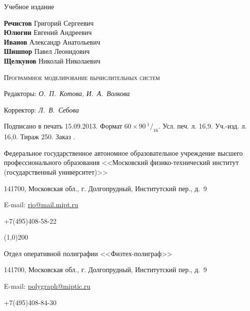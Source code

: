 \thispagestyle{empty}
\begingroup
\small
\parindent=0pt %

\begin{center}

\begin{normalsize}
\textsf{Учебное издание}
\end{normalsize}

\vfill

\begin{normalsize}
\textbf{Речистов} Григорий Сергеевич\\
\textbf{Юлюгин} Евгений Андреевич\\
\textbf{Иванов} Александр Анатольевич\\
\textbf{Шишпор} Павел Леонидович\\
\textbf{Щелкунов} Николай Николаевич\\

\end{normalsize}

\vfill

\begin{large}
\textsc{
Программное моделирование вычислительных систем
}
\end{large}
\end{center}

\vfill

Редакторы: \textit{О.~П.~Котова, И.~А.~Волкова}

Корректор: \textit{ Л.~В.~Себова}

\medskip

Подписано в печать 15.09.2013. Формат $60 \times 90\ {^1}/_{16}$. Усл. печ. л. 16,9. Уч.-изд. л. 16,0. Тираж 250. Заказ .

Федеральное государственное автономное образовательное учреждение высшего профессионального образования <<Московский физико-тех\-ни\-чес\-кий институт (госу\-дар\-ствен\-ный университет)>>

141700, Московская обл., г. Долгопрудный, Институтский пер., д.~9

E-mail: \href{mailto:rio@mail.mipt.ru}{rio@mail.mipt.ru}

+7(495)408-58-22

\line(1,0){200}

Отдел оперативной полиграфии <<Физтех-полиграф>>

141700, Московская обл., г. Долгопрудный, Институтский пер., д.~9

E-mail: \href{mailto:polygraph@miptic.ru}{polygraph@miptic.ru}

+7(495)408-84-30
\endgroup
{}\label{page:lastpage}